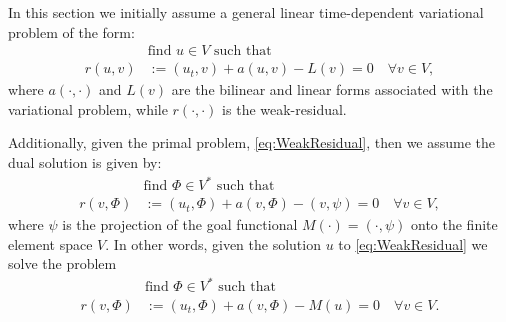 In this section we initially assume a general linear time-dependent variational
problem of the form:
\begin{equation}
    \begin{split}
        &\text{find } u \in V \text{ such that} \\
        r(u, v) &:= (u_t, v) + a(u, v) - L(v) = 0 \quad \forall v \in V,
    \end{split}
    \label{eq:WeakResidual}
\end{equation}
where $a(\cdot, \cdot)$ and $L(v)$ are the bilinear and linear forms associated
with the variational problem, while $r(\cdot, \cdot)$ is the weak-residual.

Additionally, given the primal problem, \eqref{eq:WeakResidual}, then we assume
the dual solution is given by:
\begin{equation*}
    \begin{split}
        &\text{find } \Phi \in V^* \text{ such that} \\
        r(v, \Phi) &:= (u_t, \Phi) + a(v, \Phi) - (v, \psi) = 0
                       \quad \forall v \in V,
    \end{split}
\end{equation*}
where $\psi$ is the projection of the goal functional $M(\cdot) = (\cdot, \psi)$
onto the finite element space $V$. In other words, given the solution $u$ to
\eqref{eq:WeakResidual} we solve the problem
\begin{equation}
    \begin{split}
        &\text{find } \Phi \in V^* \text{ such that} \\
        r(v, \Phi) &:= (u_t, \Phi) + a(v, \Phi) - M(u) = 0
                       \quad \forall v \in V.
    \end{split}
    \label{eq:Dual}
\end{equation}

